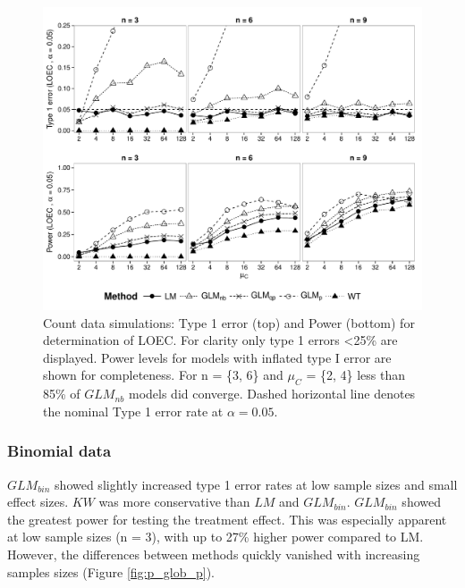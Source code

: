 \documentclass[twocolumn, natbib]{svjour3}
\begin{document}
\begin{figure}
  \centering
  \includegraphics[width = 129mm]{p_loec_c.pdf}
  \caption{Count data simulations: Type 1 error (top) and Power (bottom) for determination of LOEC.
  For clarity only type 1 errors \textless 25\% are displayed.
  Power levels for models with inflated type I error are shown for completeness.
  For n = \{3, 6\} and $\mu_C$ = \{2, 4\} less than 85\% of $GLM_{nb}$ models did converge.
  Dashed horizontal line denotes the nominal Type 1 error rate at $\alpha = 0.05$.
  }
  \label{fig:p_loec_c}
\end{figure}


\subsubsection{Binomial data}

$GLM_{bin}$ showed slightly increased type 1 error rates at low sample sizes and small effect sizes.
$KW$ was more conservative than $LM$ and $GLM_{bin}$.
$GLM_{bin}$ showed the greatest power for testing the treatment effect. 
This was especially apparent at low sample sizes (n = 3), with up to 27\% higher power compared to LM.
However, the differences between methods quickly vanished with increasing samples sizes (Figure \ref{fig:p_glob_p}).
\end{document}
